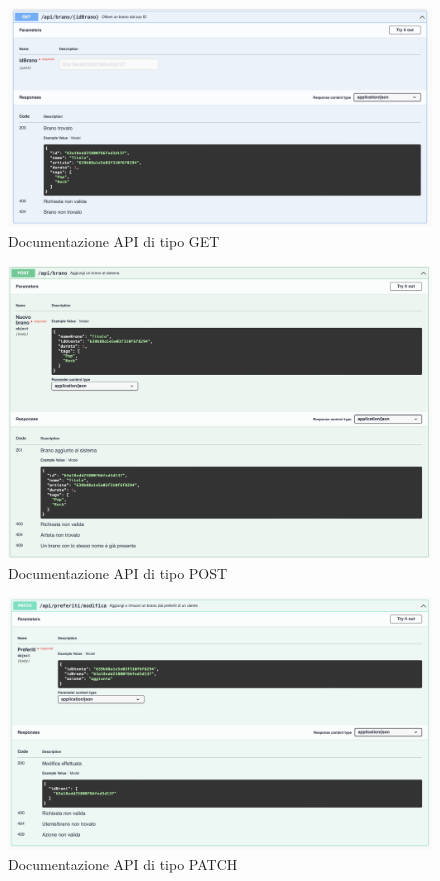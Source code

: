 \documentclass[a4paper,12pt]{article}
\begin{document}
\begin{figure}[htp]
    \centering
    \includegraphics[width=\textwidth]{code/documentazione-get.png}
    \caption{Documentazione API di tipo GET}
\end{figure}

\begin{figure}[htp]
    \centering
    \includegraphics[width=\textwidth]{code/documentazione-post.png}
    \caption{Documentazione API di tipo POST}
\end{figure}

\begin{figure}[htp]
    \centering
    \includegraphics[width=\textwidth]{code/documentazione-patch.png}
    \caption{Documentazione API di tipo PATCH}
\end{figure}
\end{document}
